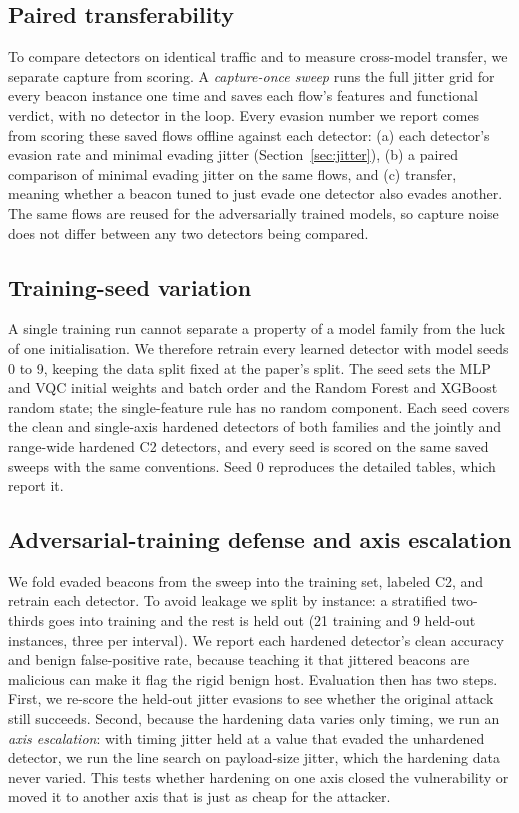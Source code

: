 \documentclass[preprint,12pt]{elsarticle}
\begin{document}
\subsection{Paired transferability}
\label{sec:paired-method}
To compare detectors on identical traffic and to measure cross-model transfer, we separate capture
from scoring. A \emph{capture-once sweep} runs the full jitter grid for every beacon instance one time
and saves each flow's features and functional verdict, with no detector in the loop. Every evasion
number we report comes from scoring these saved flows offline against each detector: (a) each
detector's evasion rate and minimal evading jitter (Section~\ref{sec:jitter}), (b) a paired comparison
of minimal evading jitter on the same flows, and (c) transfer, meaning whether a beacon tuned to just
evade one detector also evades another. The same flows are reused for the adversarially trained
models, so capture noise does not differ between any two detectors being compared.

\subsection{Training-seed variation}
\label{sec:seeds-method}
A single training run cannot separate a property of a model family from the luck of one initialisation.
We therefore retrain every learned detector with model seeds 0 to 9, keeping the data split fixed at the
paper's split. The seed sets the MLP and VQC initial weights and batch order and the Random Forest and
XGBoost random state; the single-feature rule has no random component. Each seed covers the clean and
single-axis hardened detectors of both families and the jointly and range-wide hardened C2 detectors,
and every seed is scored on the
same saved sweeps with the same conventions. Seed 0 reproduces the detailed tables, which report it.

\subsection{Adversarial-training defense and axis escalation}
\label{sec:defense-method}
We fold evaded beacons from the sweep into the training set, labeled C2, and retrain each detector. To
avoid leakage we split by instance: a stratified two-thirds goes into training and the rest is held out
(21 training and 9 held-out instances, three per interval). We report each hardened detector's clean
accuracy and benign false-positive rate, because teaching it that jittered beacons are malicious can
make it flag the rigid benign host. Evaluation then has two steps. First, we re-score the held-out
jitter evasions to see whether the original attack still succeeds. Second, because the hardening data
varies only timing, we run an \emph{axis escalation}: with timing jitter held at a value that evaded
the unhardened detector, we run the line search on payload-size jitter, which the hardening data never
varied. This tests whether hardening on one axis closed the vulnerability or moved it to another axis
that is just as cheap for the attacker.
\end{document}
